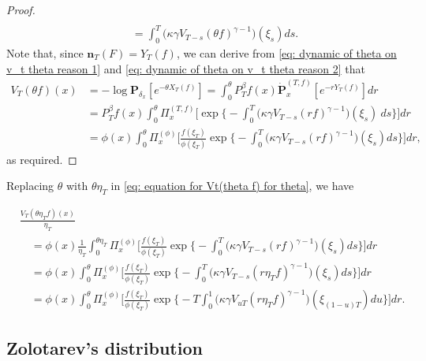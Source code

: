 \documentclass[12pt, a4paper]{amsart}
\theoremstyle{definition}
\numberwithin{equation}{section}
\begin{document}
\begin{proof}
\begin{equation}
\begin{split}
	\\&\quad = \int_0^T \big(\kappa\gamma V_{T-s}(\theta f)^{\gamma-1}\big)(\xi_s) ds.
\end{split}\end{equation}
	Note that, since $\mathbf n_T(F)= Y_T(f)$, we can derive from \eqref{eq: dynamic of theta on v_t theta reason 1} and \eqref{eq: dynamic of theta on v_t theta reason 2} that
\begin{equation}\begin{split}
	V_T(\theta f)(x)
	&= -\log \mathbf P_{\delta_x}[e^{-\theta X_T(f)}]
	= \int_0^\theta P^\beta_Tf(x)
	\dot {\mathbf P}_x^{(T,f)}[e^{-r  Y_T(f)}] dr
	\\&=P^\beta_Tf(x)\int_0^\theta \Pi_x^{(T,f)} \Big[\exp\Big\{-\int_0^T \big(\kappa\gamma V_{T-s}(r f)^{\gamma-1}\big)(\xi_s)~ds\Big\}\Big] dr
	\\&= \phi( x) \int_0^\theta \Pi_x^{(\phi)} \Big[ \frac{ f(\xi_T) } { \phi(\xi_T) } \exp\Big\{ - \int_0^T \big( \kappa \gamma V_{T-s} (r f)^{ \gamma - 1} \big) ( \xi_s) ds\Big\} \Big] dr,
\end{split}\end{equation}
	as required.
\end{proof}

	Replacing $\theta$ with $\theta \eta_T$ in \eqref{eq: equation for Vt(theta f) for theta}, we have

\begin{equation}\label{eq: equation for normalized V_T}\begin{split}
	&\frac{V_T(\theta \eta_T f)(x)}{\eta_T}
	\\&\quad= \phi(x) \frac{1}{\eta_T}\int_0^{\theta \eta_T} \Pi_x^{(\phi)} \Big[ \frac { f(\xi_T) } { \phi(\xi_T) } \exp\Big\{-\int_0^T \big(\kappa\gamma V_{T-s}(r f)^{\gamma-1}\big)(\xi_s) ds\Big\}\Big] dr
	\\&\quad = \phi(x) \int_0^{\theta} \Pi_x^{(\phi)} \Big[ \frac { f(\xi_T) } { \phi(\xi_T) }  \exp\Big\{-\int_0^T \big(\kappa\gamma V_{T-s}(r \eta_T f)^{\gamma-1}\big)(\xi_s) ds\Big\}\Big] dr
	\\&\quad = \phi(x)\int_0^{\theta} \Pi_x^{(\phi)} \Big[\frac{f(\xi_T)}{\phi(\xi_T)} \exp\Big\{-T\int_0^1 \big(\kappa\gamma V_{uT}(r \eta_T f)^{\gamma-1}\big)(\xi_{(1-u)T}) du\Big\}\Big] dr.
\end{split}\end{equation}

\subsection{Zolotarev's distribution}
\label{sec: Characterizing the Zolotarev's distribution using an non-linear delay equation}
\end{document}

